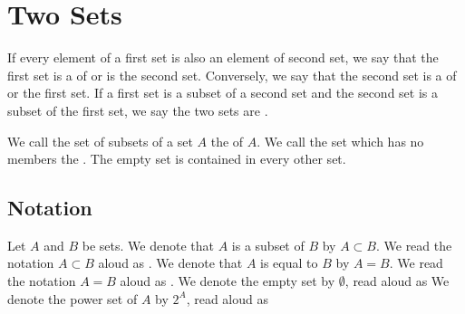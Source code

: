 \section{Two Sets}

If every element of a first set is also an element of second set, we say that the first set is a  of or is  the second set.
Conversely, we say that the second set is a  of or  the first set.
If a first set is a subset of a second set and the second set is a subset of the first set, we say the two sets are .

We call the set of subsets of a set $A$ the  of $A$.
We call the set which has no members the .
The empty set is contained in every other set.

\subsection{Notation}
Let $A$ and $B$ be sets.
We denote that $A$ is a subset of $B$ by $A \subset B$.
We read the notation $A \subset B$ aloud as .
We denote that $A$ is equal to $B$ by $A = B$.
We read the notation $A = B$ aloud as .
We denote the empty set by $\emptyset$, read aloud as 
We denote the power set of $A$ by $2^{A}$, read aloud as 


